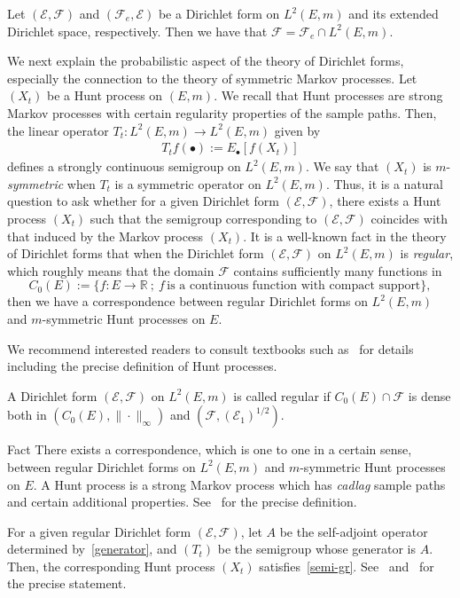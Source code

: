 \documentclass[AHL,Unicode,longabstracts,published]{cedram}
\newcommand{\ce}{\mathcal{E}}
\newcommand{\cf}{\mathcal{F}}
\newcommand{\br}{\mathbb{R}}
\begin{document}
\begin{theo}\label{ex-dr}
Let $(\ce,\cf)$ and $(\cf_e,\ce)$ be a Dirichlet form on $L^2(E,m)$ and its extended Dirichlet space, respectively. Then we have that $\cf=\cf_e\cap L^2(E,m)$.
\end{theo}

We next explain the probabilistic aspect of the theory of Dirichlet forms, especially the connection to the theory of symmetric Markov processes. Let $(X_t)$ be a Hunt process on $(E,m)$. We recall that Hunt processes are strong Markov processes with certain regularity properties of the sample paths. Then, the linear operator $T_t:L^2(E,m)\to L^2(E,m)$ given by
\begin{align}\label{semi-gr}
T_tf(\bullet):=E_{\bullet}[f(X_t)]
\end{align}
defines a strongly continuous semigroup on $L^2(E,m)$. We say that $(X_t)$ is $m$-\emph{symmetric} when $T_t$ is a symmetric operator on $L^2(E,m)$. Thus, it is a natural question to ask whether for a given Dirichlet form $(\ce,\cf)$, there exists a Hunt process $(X_t)$ such that the semigroup corresponding to $(\ce,\cf)$ coincides with that induced by the Markov process $(X_t)$. It is a well-known fact in the theory of Dirichlet forms that when the Dirichlet form $(\ce,\cf)$ on $L^2(E,m)$ is \emph{regular}, which roughly means that the domain $\cf$ contains sufficiently many functions in
\[
C_0(E):=\{f:E\to\br\ ;\ f\,\text{is\ a\ continuous\ function\ with\ compact\ support}\},
\]
then we have a correspondence between regular Dirichlet forms on $L^2(E,m)$ and $m$-symmetric Hunt processes on $E$.

\begin{rema}
We recommend interested readers to consult textbooks such as~\cite{CF,FOT} for details including the precise definition of Hunt processes.
\end{rema}

\begin{defi}\label{def-reg}
A Dirichlet form $(\ce,\cf)$ on $L^2(E,m)$ is called regular if $C_0(E)\cap\cf$ is dense both in $(C_0(E),\|\cdot\|_{\infty})$ and $(\cf,(\ce_1)^{1/2})$.
\end{defi}

\begin{enonce}[plain]{Fact}
There exists a correspondence, which is one to one in a certain sense, between regular Dirichlet forms on $L^2(E,m)$ and $m$-symmetric Hunt processes on $E$. A Hunt process is a strong Markov process which has \emph{cadlag} sample paths and certain additional properties. See~\cite[Appendix A.2]{FOT} for the precise definition.

For a given regular Dirichlet form $(\ce,\cf)$, let $A$ be the self-adjoint operator determined by~\eqref{generator}, and $(T_t)$ be the semigroup whose generator is $A$. Then, the corresponding Hunt process $(X_t)$ satisfies~\eqref{semi-gr}. See~\cite[Chapter~7]{FOT} and~\cite[Theorem~1.5.1]{CF} for the precise statement.
\end{enonce}
\end{document}
